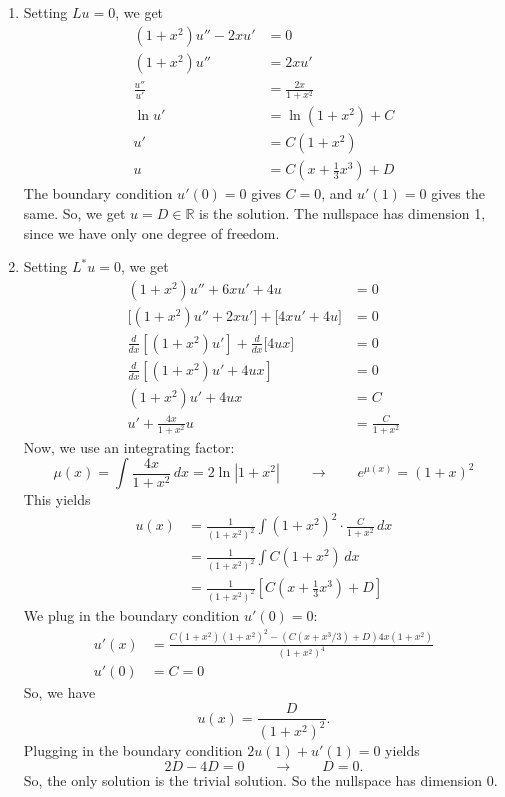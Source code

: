 \documentclass[10pt,letterpaper]{report}
\newcommand{\R}{\mathbb{R}}
\newcommand{\so}{\qquad \rightarrow \qquad}
\newcommand{\abs}[1]{\left|{#1}\right|}
\begin{document}
\begin{enumerate}
\begin{enumerate}
    \item Setting $Lu = 0$, we get
    \begin{align*}
        (1+x^2)u'' - 2xu' &= 0 \\
        (1+x^2)u'' &= 2xu' \\
        \frac{u''}{u'} &= \frac{2x}{1 + x^2} \\
        \ln u' &= \ln (1 + x^2) + C \\
        u' &= C(1 + x^2) \\
        u &= C\left(x + \frac{1}{3}x^3\right) + D
    \end{align*}
    The boundary condition $u'(0) = 0$ gives $C = 0$, and $u'(1) = 0$ gives the same. So, we get $u = D \in \R$ is the solution. The nullspace has dimension 1, since we have only one degree of freedom.
    
    \item Setting $L^*u = 0$, we get
    \begin{align*}
        (1+x^2)u'' + 6xu' + 4u &= 0 \\
        \big[(1+x^2)u'' + 2xu'\big] +\big[ 4xu' + 4u \big] &= 0 \\
        \frac{d}{dx}\left[(1+x^2)u'\right] + \frac{d}{dx}\big[4ux\big] &= 0
        \\
        \frac{d}{dx}\left[(1+x^2)u' + 4ux\right] &= 0
        \\
        (1+x^2)u' + 4ux &= C
        \\
        u' + \frac{4x}{1+x^2}u &= \frac{C}{1+x^2}
    \end{align*}
    Now, we use an integrating factor:
    \[
    \mu(x) = \int\frac{4x}{1+x^2}\,dx = 2\ln\abs{1+x^2} \so e^{\mu(x)} = (1+x)^2
    \]
    This yields
    \begin{align*}
        u(x) &= \frac{1}{(1+x^2)^2}\int(1+x^2)^2\cdot\frac{C}{1+x^2}\,dx
        \\
        &=
        \frac{1}{(1+x^2)^2}\int C(1+x^2)\,dx
        \\
        &=
        \frac{1}{(1+x^2)^2}\left[C\left(x + \frac{1}{3}x^3\right) + D\right]
    \end{align*}
    We plug in the boundary condition $u'(0) = 0:$
    \begin{align*}
        u'(x) &= \frac{C(1+x^2)(1+x^2)^2 - (C(x+x^3/3)+D)4x(1+x^2)}{(1+x^2)^4}
        \\
        u'(0) &= C = 0
    \end{align*}
    So, we have 
    \[
    u(x) = \frac{D}{(1+x^2)^2}.
    \]
    Plugging in the boundary condition $2u(1)+u'(1) = 0$ yields
    \[
    2D - 4D = 0 \so D = 0.
    \]
    So, the only solution is the trivial solution. So the nullspace has dimension 0.
\end{enumerate}


\end{enumerate}
\end{document}
